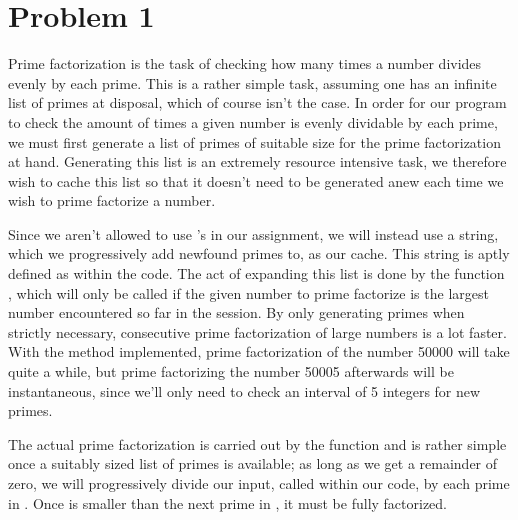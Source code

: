 \section*{Problem 1}
Prime factorization is the task of checking how many times a number divides evenly by each prime.
This is a rather simple task, assuming one has an infinite list of primes at disposal, which of course isn't the case.
In order for our program to check the amount of times a given number is evenly dividable by each prime, we must first generate a list of primes of suitable size for the prime factorization at hand. Generating this list is an extremely resource intensive task, we therefore wish to cache this list so that it doesn't need to be generated anew each time we wish to prime factorize a number.

Since we aren't allowed to use 's in our assignment, we will instead use a string, which we progressively add newfound primes to, as our cache. This string is aptly defined as  within the code.
The act of expanding this list is done by the function , which will only be called if the given number to prime factorize is the largest number encountered so far in the session.
By only generating primes when strictly necessary, consecutive prime factorization of large numbers is a lot faster.
With the method implemented, prime factorization of the number 50000 will take quite a while, but prime factorizing the number 50005 afterwards will be instantaneous, since we'll only need to check an interval of 5 integers for new primes.

The actual prime factorization is carried out by the function  and is rather simple once a suitably sized list of primes is available; as long as we get a remainder of zero, we will progressively divide our input, called  within our code, by each prime in . Once  is smaller than the next prime in , it must be fully factorized.
